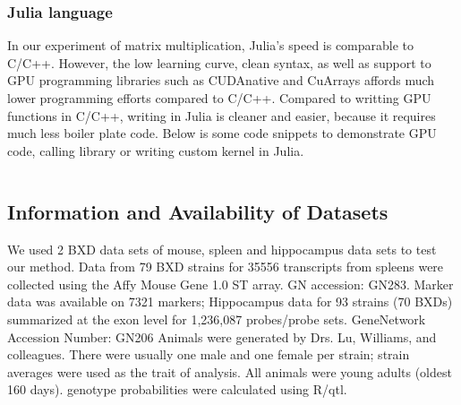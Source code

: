 \documentclass[9pt,twocolumn,twoside,lineno]{gsag3jnl}
\begin{document}
\subsubsection{Julia language}
In our experiment of matrix multiplication, Julia's speed is comparable to C/C++. 
However, the low learning curve, clean syntax, as well as support to GPU programming libraries such as CUDAnative \citep{CUDAnative.jl-2018} and CuArrays affords much lower programming efforts compared to C/C++.
Compared to writting GPU functions in C/C++, writing in Julia is cleaner and easier, because it requires much less boiler plate code.
Below is some code snippets to demonstrate GPU code, calling library or writing custom kernel in Julia. 

\inputminted{julia}{code/gpu.jl}

\subsection{Information and Availability of Datasets}

We used 2 BXD data sets of mouse, spleen and hippocampus data sets to test our method. 
Data from 79 BXD strains for 35556 transcripts from spleens were collected using the Affy Mouse Gene 1.0 ST array. GN accession: GN283. Marker data was available on 7321 markers;
Hippocampus data for 93 strains (70 BXDs) summarized at the exon level for 1,236,087 probes/probe sets.
GeneNetwork Accession Number: GN206
Animals were generated by Drs. Lu, Williams, and colleagues. There were usually one male and one female per strain; strain averages were used as the trait of analysis. All animals were young adults (oldest 160 days).  genotype probabilities were calculated using R/qtl.
\end{document}

